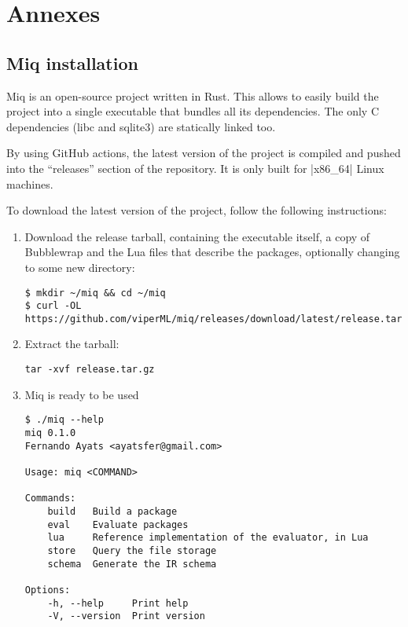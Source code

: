 \chapter{Annexes}

\section{Miq installation}

Miq is an open-source project written in Rust. This allows
to easily build the project into a single executable that
bundles all its dependencies. The only C dependencies (libc
and sqlite3) are statically linked too.

By using GitHub actions, the latest version of the project
is compiled and pushed into the ``releases'' section of the
repository. It is only built for |x86_64| Linux machines.

To download the latest version of the project, follow the
following instructions:

\begin{enumerate}
    \item Download the release tarball, containing the
    executable itself, a copy of Bubblewrap and the Lua
    files that describe the packages, optionally changing to
    some new directory:
\begin{verbatim}
$ mkdir ~/miq && cd ~/miq
$ curl -OL https://github.com/viperML/miq/releases/download/latest/release.tar.gz
\end{verbatim}

    \item Extract the tarball:
\begin{verbatim}
tar -xvf release.tar.gz
\end{verbatim}


    \item Miq is ready to be used
\begin{verbatim}
$ ./miq --help
miq 0.1.0
Fernando Ayats <ayatsfer@gmail.com>

Usage: miq <COMMAND>

Commands:
    build   Build a package
    eval    Evaluate packages
    lua     Reference implementation of the evaluator, in Lua
    store   Query the file storage
    schema  Generate the IR schema

Options:
    -h, --help     Print help
    -V, --version  Print version
\end{verbatim}

\end{enumerate}




